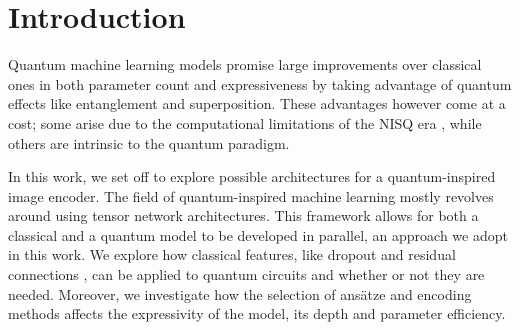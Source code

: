 \documentclass[12pt, a4paper, oneside]{report}
\begin{document}
\newpage

\setcounter{page}{1}

\chapter{Introduction}




Quantum machine learning models promise large improvements over classical ones in both parameter count and expressiveness by taking advantage of quantum effects like entanglement and superposition. These advantages however come at a cost; some arise due to the computational limitations of the NISQ era \cite{nisq}, while others are intrinsic to the quantum paradigm.

In this work, we set off to explore possible architectures for a quantum-inspired image encoder. The field of quantum-inspired machine learning \cite{quantum_inspired} mostly revolves around using tensor network architectures. This framework allows for both a classical and a quantum model to be developed in parallel, an approach we adopt in this work. We explore how classical features, like dropout \cite{dropout} and residual connections \cite{residuals}, can be applied to quantum circuits and whether or not they are needed. Moreover, we investigate how the selection of ansätze and encoding methods affects the expressivity of the model, its depth and parameter efficiency.
\end{document}
